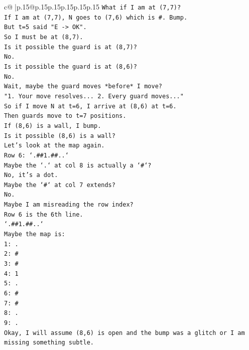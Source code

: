 \documentclass{article}
\begin{document}
{\begin{supertabular}{c@{$\;$}|p{.15\linewidth}@{}p{.15\linewidth}p{.15\linewidth}p{.15\linewidth}p{.15\linewidth}p{.15\linewidth}}
{{{\texttt{What if I am at (7,7)?} \\
\texttt{If I am at (7,7), N goes to (7,6) which is \#. Bump.} \\
\texttt{But t=5 said "E {-}> OK".} \\
\texttt{So I must be at (8,7).} \\
\texttt{Is it possible the guard is at (8,7)?} \\
\texttt{No.} \\
\texttt{Is it possible the guard is at (8,6)?} \\
\texttt{No.} \\
\texttt{Wait, maybe the guard moves *before* I move?} \\
\texttt{"1. Your move resolves... 2. Every guard moves..."} \\
\texttt{So if I move N at t=6, I arrive at (8,6) at t=6.} \\
\texttt{Then guards move to t=7 positions.} \\
\texttt{If (8,6) is a wall, I bump.} \\
\texttt{Is it possible (8,6) is a wall?} \\
\texttt{Let's look at the map again.} \\
\texttt{Row 6: `.\#\#1.\#\#..`} \\
\texttt{Maybe the `.` at col 8 is actually a `\#`?} \\
\texttt{No, it's a dot.} \\
\texttt{Maybe the `\#` at col 7 extends?} \\
\texttt{No.} \\
\texttt{Maybe I am misreading the row index?} \\
\texttt{Row 6 is the 6th line.} \\
\texttt{`.\#\#1.\#\#..`} \\
\texttt{Maybe the map is:} \\
\texttt{1: .} \\
\texttt{2: \#} \\
\texttt{3: \#} \\
\texttt{4: 1} \\
\texttt{5: .} \\
\texttt{6: \#} \\
\texttt{7: \#} \\
\texttt{8: .} \\
\texttt{9: .} \\
\texttt{Okay, I will assume (8,6) is open and the bump was a glitch or I am missing something subtle.} \\
}}}
\end{supertabular}}
\end{document}
